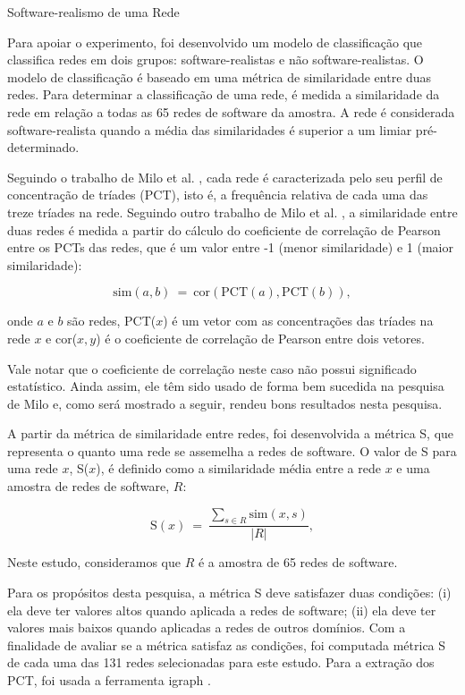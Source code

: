 \begin{section}{Software-realismo de uma Rede} \label{sec:realismo-rede}

Para apoiar o experimento, foi desenvolvido um modelo de classificação que classifica redes em dois grupos: software-realistas e não software-realistas. O modelo de classificação é baseado em uma métrica de similaridade entre duas redes. Para determinar a classificação de uma rede, é medida a similaridade da rede em relação a todas as 65 redes de software da amostra. A rede é considerada software-realista quando a média das similaridades é superior a um limiar pré-determinado.
	
Seguindo o trabalho de Milo et al. \cite{Milo2002}, cada rede é caracterizada pelo seu perfil de concentração de tríades (PCT), isto é, a frequência relativa de cada uma das treze tríades na rede. Seguindo outro trabalho de Milo et al. \cite{Milo2004}, a similaridade entre duas redes é medida a partir do cálculo do coeficiente de correlação de Pearson entre os PCTs das redes, que é um valor entre -1 (menor similaridade) e 1 (maior similaridade):

$$
\mathrm{sim}(a, b) ~=~ 
  \mathrm{cor}(\mathrm{PCT}(a), \mathrm{PCT}(b))\mathrm{,}
$$

onde $a$ e $b$ são redes, PCT($x$) é um vetor com as concentrações das tríades na rede $x$ e cor($x, y$) é o coeficiente de correlação de Pearson entre dois vetores.

Vale notar que o coeficiente de correlação neste caso não possui significado estatístico. Ainda assim, ele têm sido usado de forma bem sucedida na pesquisa de Milo e, como será mostrado a seguir, rendeu bons resultados nesta pesquisa.

A partir da métrica de similaridade entre redes, foi desenvolvida a métrica S, que representa o quanto uma rede se assemelha a redes de software. O valor de S para uma rede $x$, S($x$), é definido como a similaridade média entre a rede $x$ e uma amostra de redes de software, $R$:

$$
\mathrm{S}(x) ~=~ \frac{
\displaystyle\sum_{s \in R} \mathrm{sim}(x, s)
}{|R|} \mathrm{,}
$$

Neste estudo, consideramos que $R$ é a amostra de 65 redes de software.

Para os propósitos desta pesquisa, a métrica S deve satisfazer duas condições: (i) ela deve ter valores altos quando aplicada a redes de software; (ii) ela deve ter valores mais baixos quando aplicadas a redes de outros domínios. Com a finalidade de avaliar se a métrica satisfaz as condições, foi computada métrica S de cada uma das 131 redes selecionadas para este estudo. Para a extração dos PCT, foi usada a ferramenta igraph \cite{igraph}.


\end{section}
